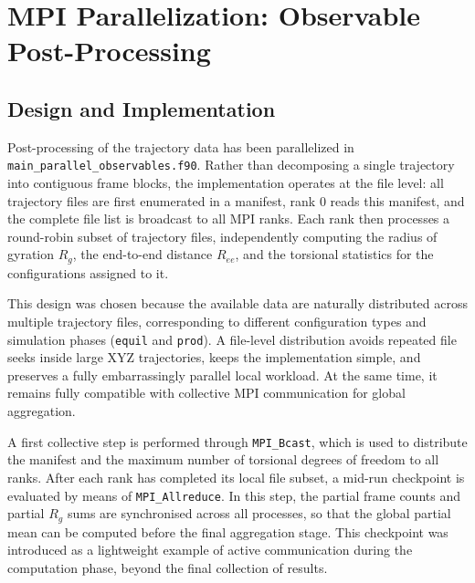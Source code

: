 \documentclass[11pt, a4paper]{article}
\begin{document}
\section{MPI Parallelization: Observable Post-Processing}
\label{sec:parallel_observables}

\subsection{Design and Implementation}

Post-processing of the trajectory data has been parallelized in
\texttt{main\_parallel\_observables.f90}. Rather than decomposing a single
trajectory into contiguous frame blocks, the implementation operates at the
file level: all trajectory files are first enumerated in a manifest, rank 0
reads this manifest, and the complete file list is broadcast to all MPI ranks.
Each rank then processes a round-robin subset of trajectory files,
independently computing the radius of gyration \(R_g\), the end-to-end
distance \(R_{ee}\), and the torsional statistics for the configurations
assigned to it.

This design was chosen because the available data are naturally distributed
across multiple trajectory files, corresponding to different configuration
types and simulation phases (\texttt{equil} and \texttt{prod}). A file-level
distribution avoids repeated file seeks inside large XYZ trajectories, keeps
the implementation simple, and preserves a fully embarrassingly parallel local
workload. At the same time, it remains fully compatible with collective MPI
communication for global aggregation.

A first collective step is performed through \texttt{MPI\_Bcast}, which is used
to distribute the manifest and the maximum number of torsional degrees of
freedom to all ranks. After each rank has completed its local file subset, a
mid-run checkpoint is evaluated by means of \texttt{MPI\_Allreduce}. In this
step, the partial frame counts and partial \(R_g\) sums are synchronised across
all processes, so that the global partial mean can be computed before the final
aggregation stage. This checkpoint was introduced as a lightweight example of
active communication during the computation phase, beyond the final collection
of results.
\end{document}
